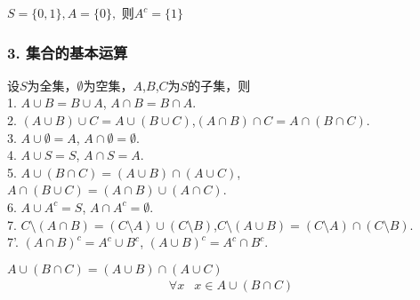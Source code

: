 \documentclass{beamer}
\begin{document}
\begin{CJK*}{UTF8}{gbsn}
\begin{frame}
\begin{minipage}{0.69\linewidth}
\begin{Def}
  \end{Def}\pause
\end{minipage}
\begin{minipage}{0.29\linewidth}
  \end{minipage}\pause
    \begin{Ex}
        $S = \{0,1\}, A =  \{0\},$ 则$A^c = \{1\}$
    \end{Ex}
\end{frame}


\begin{frame}
  \frametitle{3. 集合的基本运算}
  \begin{Thm}
设$S$为全集，$\emptyset$为空集，$A$,$B$,$C$为$S$的子集，则\\
1. $A \cup B = B \cup A$, $A \cap B = B \cap A$.\\
2. $(A \cup B) \cup C = A \cup (B \cup C)$,$(A \cap B) \cap C = A \cap (B \cap C)$.\\
3. $A \cup \emptyset = A$, $A \cap \emptyset = \emptyset$.\\
4. $A \cup S = S$, $A \cap S = A$.\\
5. $A \cup (B \cap C) = (A \cup B) \cap (A \cup C)$, $A \cap (B \cup C) = (A \cap B) \cup (A \cap C)$.\\
6. $A \cup A^c = S$, $A \cap A^c = \emptyset$.\\
7. $C \setminus (A \cap B) = (C \setminus A) \cup (C \setminus B)$,$C\setminus (A \cup B) = (C \setminus A) \cap (C \setminus B)$.\\ 
7'. $(A \cap B)^c = A^c \cup B^c$, $(A \cup B)^c = A^c \cap B^c$.\\
  \end{Thm}
\end{frame}
\begin{frame}
  $A \cup (B \cap C) = (A \cup B) \cap (A \cup C)$
  \pause
  \begin{equation*}
    \begin{split}
      \forall x &x \in A \cup (B \cap C) \\

\end{split}
\end{equation*}
\end{frame}
\end{CJK*}
\end{document}
